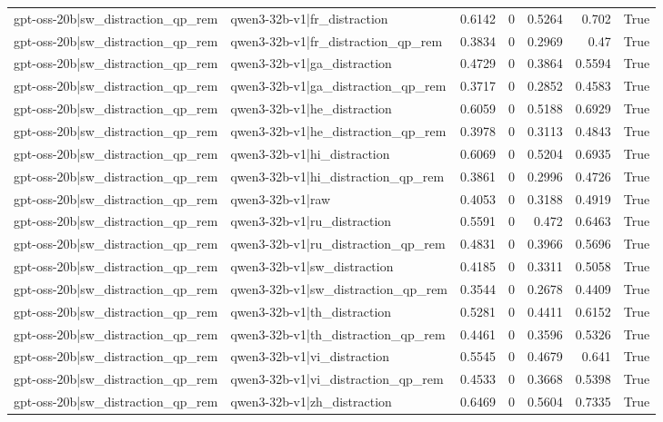 \begin{table}
\begin{tabular}{l l r r r r l}
gpt-oss-20b|sw_distraction_qp_rem & qwen3-32b-v1|fr_distraction & 0.6142 & 0 & 0.5264 & 0.702 & True \\
gpt-oss-20b|sw_distraction_qp_rem & qwen3-32b-v1|fr_distraction_qp_rem & 0.3834 & 0 & 0.2969 & 0.47 & True \\
gpt-oss-20b|sw_distraction_qp_rem & qwen3-32b-v1|ga_distraction & 0.4729 & 0 & 0.3864 & 0.5594 & True \\
gpt-oss-20b|sw_distraction_qp_rem & qwen3-32b-v1|ga_distraction_qp_rem & 0.3717 & 0 & 0.2852 & 0.4583 & True \\
gpt-oss-20b|sw_distraction_qp_rem & qwen3-32b-v1|he_distraction & 0.6059 & 0 & 0.5188 & 0.6929 & True \\
gpt-oss-20b|sw_distraction_qp_rem & qwen3-32b-v1|he_distraction_qp_rem & 0.3978 & 0 & 0.3113 & 0.4843 & True \\
gpt-oss-20b|sw_distraction_qp_rem & qwen3-32b-v1|hi_distraction & 0.6069 & 0 & 0.5204 & 0.6935 & True \\
gpt-oss-20b|sw_distraction_qp_rem & qwen3-32b-v1|hi_distraction_qp_rem & 0.3861 & 0 & 0.2996 & 0.4726 & True \\
gpt-oss-20b|sw_distraction_qp_rem & qwen3-32b-v1|raw & 0.4053 & 0 & 0.3188 & 0.4919 & True \\
gpt-oss-20b|sw_distraction_qp_rem & qwen3-32b-v1|ru_distraction & 0.5591 & 0 & 0.472 & 0.6463 & True \\
gpt-oss-20b|sw_distraction_qp_rem & qwen3-32b-v1|ru_distraction_qp_rem & 0.4831 & 0 & 0.3966 & 0.5696 & True \\
gpt-oss-20b|sw_distraction_qp_rem & qwen3-32b-v1|sw_distraction & 0.4185 & 0 & 0.3311 & 0.5058 & True \\
gpt-oss-20b|sw_distraction_qp_rem & qwen3-32b-v1|sw_distraction_qp_rem & 0.3544 & 0 & 0.2678 & 0.4409 & True \\
gpt-oss-20b|sw_distraction_qp_rem & qwen3-32b-v1|th_distraction & 0.5281 & 0 & 0.4411 & 0.6152 & True \\
gpt-oss-20b|sw_distraction_qp_rem & qwen3-32b-v1|th_distraction_qp_rem & 0.4461 & 0 & 0.3596 & 0.5326 & True \\
gpt-oss-20b|sw_distraction_qp_rem & qwen3-32b-v1|vi_distraction & 0.5545 & 0 & 0.4679 & 0.641 & True \\
gpt-oss-20b|sw_distraction_qp_rem & qwen3-32b-v1|vi_distraction_qp_rem & 0.4533 & 0 & 0.3668 & 0.5398 & True \\
gpt-oss-20b|sw_distraction_qp_rem & qwen3-32b-v1|zh_distraction & 0.6469 & 0 & 0.5604 & 0.7335 & True \\

\end{tabular}
\end{table}
